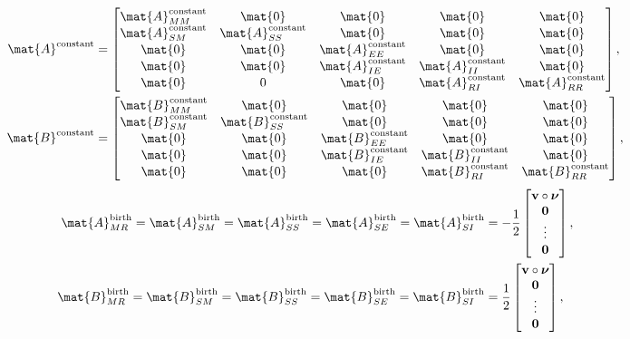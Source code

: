 \documentclass{jpmarticle}
\renewcommand{\vec}[1]{\boldsymbol{\mathrm{#1}}}
\begin{document}
\begin{equation}
  \begin{split}
    \mat{A}^{\text{constant}} &=
    \begin{bmatrix}
      \mat{A}_{MM}^{\text{constant}} & \mat{0} & \mat{0} & \mat{0} & \mat{0}
      \\
      \mat{A}_{SM}^{\text{constant}} & \mat{A}_{SS}^{\text{constant}} &
      \mat{0} & \mat{0} & \mat{0}
      \\
      \mat{0} & \mat{0} & \mat{A}_{EE}^{\text{constant}} & \mat{0} & \mat{0}
      \\
      \mat{0} & \mat{0} & \mat{A}_{IE}^{\text{constant}} &
      \mat{A}_{II}^{\text{constant}} & \mat{0}
      \\
      \mat{0} & 0 & \mat{0} & \mat{A}_{RI}^{\text{constant}} &
      \mat{A}_{RR}^{\text{constant}}
    \end{bmatrix},
    \\
    \mat{B}^{\text{constant}} &=
    \begin{bmatrix}
      \mat{B}_{MM}^{\text{constant}} & \mat{0} & \mat{0} & \mat{0} & \mat{0}
      \\
      \mat{B}_{SM}^{\text{constant}} & \mat{B}_{SS}^{\text{constant}} &
      \mat{0} & \mat{0} & \mat{0}
      \\
      \mat{0} & \mat{0} & \mat{B}_{EE}^{\text{constant}} & \mat{0} & \mat{0}
      \\
      \mat{0} & \mat{0} & \mat{B}_{IE}^{\text{constant}} &
      \mat{B}_{II}^{\text{constant}} & \mat{0}
      \\
      \mat{0} & \mat{0} & \mat{0} & \mat{B}_{RI}^{\text{constant}} &
      \mat{B}_{RR}^{\text{constant}}
    \end{bmatrix},
  \end{split}
\end{equation}
\begin{equation}
  \begin{split}
    \mat{A}_{MR}^{\text{birth}} =
    \mat{A}_{SM}^{\text{birth}} =
    \mat{A}_{SS}^{\text{birth}} =
    \mat{A}_{SE}^{\text{birth}} =
    \mat{A}_{SI}^{\text{birth}} &=
    - \frac{1}{2}
    \begin{bmatrix}
      \vec{v} \circ \vec{\nu} \\ \vec{0} \\ \vdots \\ \vec{0}
    \end{bmatrix},
    \\
    \mat{B}_{MR}^{\text{birth}} =
    \mat{B}_{SM}^{\text{birth}} =
    \mat{B}_{SS}^{\text{birth}} =
    \mat{B}_{SE}^{\text{birth}} =
    \mat{B}_{SI}^{\text{birth}} &=
    \frac{1}{2}
    \begin{bmatrix}
      \vec{v} \circ \vec{\nu} \\ \vec{0} \\ \vdots \\ \vec{0}
    \end{bmatrix},
  \end{split}
\end{equation}
\end{document}
